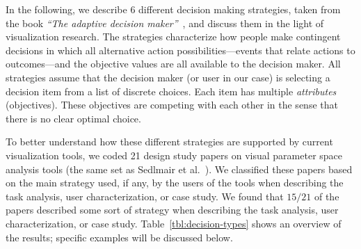 In the following, we describe 6 different decision making strategies, taken from the book \emph{``The adaptive decision
maker''}~\citep{Payne:1993}, and discuss them in the light of visualization research.
The strategies characterize how people make contingent decisions in which all alternative
action possibilities---events that relate actions to outcomes---and the objective
values are all available to the decision maker.
All strategies assume that the decision maker (or user in our case)
is selecting a decision item from a list of discrete choices. Each item
has multiple \emph{attributes} (objectives). These objectives are competing with
each other in the sense that there is no clear optimal choice. 


To better understand how these different strategies are supported by current
visualization tools, we coded 21 design study papers on visual parameter space
analysis tools (the same set as Sedlmair et al.~\citep{Sedlmair:2014}). We
classified these papers based on the main strategy used, if any,
by the users of the tools when describing the task analysis, user
characterization, or case study. We found that $15/21$ of the papers described
some sort of strategy when describing the task analysis, user characterization,
or case study. Table~\ref{tbl:decision-types} shows an overview of the results;
specific examples will be discussed below.





